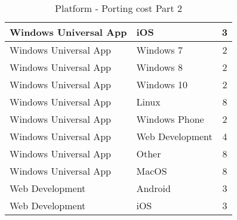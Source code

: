\begin{table}[h]
\begin{tabular}{|l|l|c|}
	Windows Universal App  			& iOS 				& 3     		\\ \hline
	Windows Universal App  			& Windows 7 				& 2     		\\ \hline
	Windows Universal App  			& Windows 8 				& 2     		\\ \hline
	Windows Universal App  			& Windows 10				& 2     		\\ \hline
	Windows Universal App  			& Linux 				& 8     		\\ \hline
	Windows Universal App  			& Windows Phone 				& 2     		\\ \hline
	Windows Universal App  			& Web Development 				& 4     		\\ \hline
	Windows Universal App  			& Other 				& 8     		\\ \hline
	Windows Universal App  			& MacOS 				& 8     		\\ \hline
	Web Development  			& Android 				&3     		\\ \hline
	Web Development  			& iOS 				& 3     		\\ \hline
\end{tabular} 
\caption{Platform - Porting cost Part 2} 
\label{platformportingcosts2} 
\end{table}
